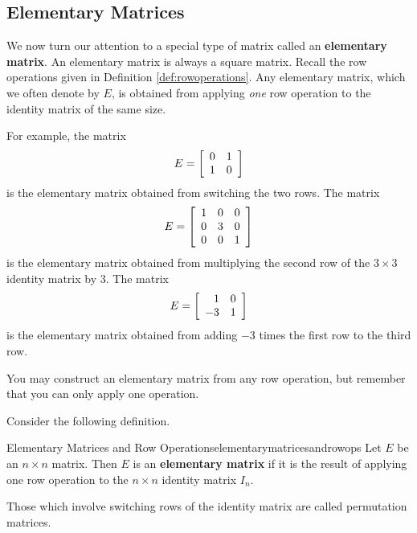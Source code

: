 
\subsection{Elementary Matrices}

We now turn our attention to a special type of matrix called an \textbf{elementary matrix}. 
An elementary matrix is always a square matrix. Recall the row operations given in Definition \ref{def:rowoperations}.
Any elementary matrix, which we often denote by $E$, is obtained from applying
{\em one\em} row operation to the identity matrix of the same size. 

For example, the matrix
\begin{equation*}
E = 
\left[
\begin{array}{rr}
0 & 1 \\
1 & 0
\end{array}
\right]
\end{equation*}
is the elementary matrix obtained from switching the two rows. 
The matrix 
\begin{equation*}
E = 
\left[
\begin{array}{rrr}
1 & 0 & 0 \\
0 & 3 & 0 \\
0 & 0 & 1
\end{array}
\right]
\end{equation*}
is the elementary matrix obtained from multiplying the second row of the $3 \times 3$ identity matrix
by $3$.
The matrix
\begin{equation*}
E = 
\left[
\begin{array}{rr}
1 & 0 \\
-3 & 1
\end{array}
\right]
\end{equation*}
is the elementary matrix obtained from adding $-3$ times the first row to the third row.

You may construct an elementary matrix from any row operation, but remember that you can only apply one operation.

Consider the following definition. 

\begin{definition}{Elementary Matrices and Row Operations}{elementarymatricesandrowops}
Let $E$ be an $n \times n$ matrix. Then $E$ is an \textbf{elementary matrix} 
if it is the result of applying one row operation to the $n \times n$ identity matrix $I_n$. 

Those which involve switching rows of the identity matrix are called
permutation matrices.
\end{definition}


